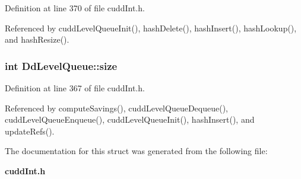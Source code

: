 Definition at line 370 of file cudd\-Int.h.

Referenced by cudd\-Level\-Queue\-Init(), hash\-Delete(), hash\-Insert(), hash\-Lookup(), and hash\-Resize().
\subsubsection{\setlength{\rightskip}{0pt plus 5cm}int \bf{Dd\-Level\-Queue::size}}\label{structDdLevelQueue_a5d7bfda570a662d1fa39fbabb2c4e81}




Definition at line 367 of file cudd\-Int.h.

Referenced by compute\-Savings(), cudd\-Level\-Queue\-Dequeue(), cudd\-Level\-Queue\-Enqueue(), cudd\-Level\-Queue\-Init(), hash\-Insert(), and update\-Refs().

The documentation for this struct was generated from the following file:\begin{CompactItemize}
\item 
\bf{cudd\-Int.h}\end{CompactItemize}
